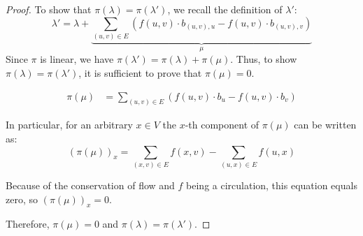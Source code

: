 \documentclass[10pt,twocolumn]{article}
\begin{document}
\begin{proof}

To show that \(\pi(\lambda) = \pi(\lambda')\), we recall the definition of \(\lambda'\):
\[ \lambda' = \lambda + \underbrace{\sum_{(u,v) \in E} \left(f(u,v) \cdot b_{(u,v),u} - f(u,v) \cdot b_{(u,v),v}\right)}_{\mu} \]
Since \(\pi\) is linear, we have \(\pi(\lambda') = \pi(\lambda) + \pi(\mu)\). Thus, to show \(\pi(\lambda) = \pi(\lambda')\), it is sufficient to prove that \(\pi(\mu) = 0\).

\begin{equation}
    \begin{split}
    \pi(\mu) &= \sum_{(u,v) \in E} \left(f(u,v) \cdot b_u - f(u,v) \cdot b_v\right)
    \end{split}
\end{equation}

In particular, for an arbitrary $x\in V$ the \(x\)-th component of \(\pi(\mu)\) can be written as:
\[ (\pi(\mu))_x = \sum_{(x,v) \in E} f(x,v) - \sum_{(u,x) \in E} f(u,x) \]

Because of the conservation of flow and \(f\) being a circulation, this equation equals zero, so \((\pi(\mu))_x = 0\).

Therefore, \(\pi(\mu) = 0\) and \(\pi(\lambda) = \pi(\lambda')\).
\end{proof}
  
\end{document}
